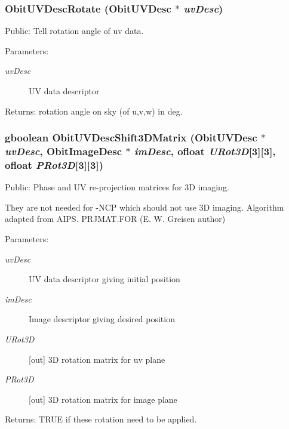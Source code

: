 \subsubsection{ Obit\-UVDesc\-Rotate ({\bf Obit\-UVDesc} $\ast$ {\em uv\-Desc})}\label{ObitUVDesc_8h_a20}


Public: Tell rotation angle of uv data. 

\begin{Desc}
\item[Parameters:]
\begin{description}
\item[{\em uv\-Desc}]UV data descriptor \end{description}
\end{Desc}
\begin{Desc}
\item[Returns:]rotation angle on sky (of u,v,w) in deg. \end{Desc}
\subsubsection{\setlength{\rightskip}{0pt plus 5cm}gboolean Obit\-UVDesc\-Shift3DMatrix ({\bf Obit\-UVDesc} $\ast$ {\em uv\-Desc}, {\bf Obit\-Image\-Desc} $\ast$ {\em im\-Desc}, {\bf ofloat} {\em URot3D}[3][3], {\bf ofloat} {\em PRot3D}[3][3])}\label{ObitUVDesc_8h_a21}


Public: Phase and UV re-projection matrices for 3D imaging. 

They are not needed for -NCP which should not use 3D imaging. Algorithm adapted from AIPS. PRJMAT.FOR (E. W. Greisen author) \begin{Desc}
\item[Parameters:]
\begin{description}
\item[{\em uv\-Desc}]UV data descriptor giving initial position \item[{\em im\-Desc}]Image descriptor giving desired position \item[{\em URot3D}][out] 3D rotation matrix for uv plane \item[{\em PRot3D}][out] 3D rotation matrix for image plane \end{description}
\end{Desc}
\begin{Desc}
\item[Returns:]TRUE if these rotation need to be applied. \end{Desc}
